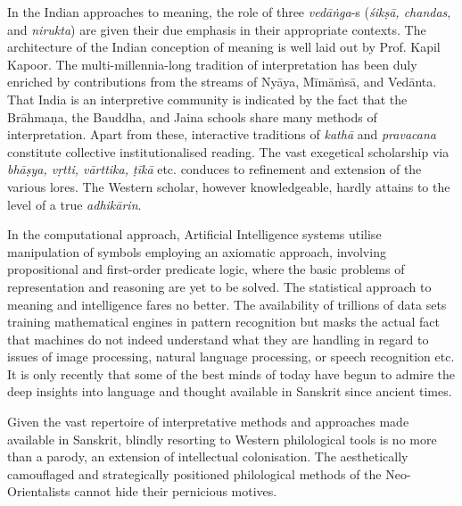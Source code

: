 In the Indian approaches to meaning, the role of three \textit{vedāṅga}-s (\textit{śikṣā, chandas}, and \textit{nirukta}) are given their due emphasis in their appropriate contexts. The architecture of the Indian conception of meaning is well laid out by Prof. Kapil Kapoor. The multi-millennia-long tradition of interpretation has been duly enriched by contributions from the streams of Nyāya, Mīmāṁsā, and Vedānta. That India is an interpretive community is indicated by the fact that the Brāhmaṇa, the Bauddha, and Jaina schools share many methods of interpretation. Apart from these, interactive traditions of \textit{kathā} and \textit{pravacana} constitute collective institutionalised reading. The vast exegetical scholarship via \textit{bhāṣya, vṛtti, vārttika, ṭīkā} etc. conduces to refinement and extension of the various lores. The Western scholar, however knowledgeable, hardly attains to the level of a true \textit{adhikārin}.

In the computational approach, Artificial Intelligence systems utilise manipulation of symbols employing an axiomatic approach, involving propositional and first-order predicate logic, where the basic problems of representation and reasoning are yet to be solved. The statistical approach to meaning and intelligence fares no better. The availability of trillions of data sets training mathematical engines in pattern recognition but masks the actual fact that machines do not indeed understand what they are handling in regard to issues of image processing, natural language processing, or speech recognition etc. It is only recently that some of the best minds of today have begun to admire the deep insights into language and thought available in Sanskrit since ancient times.

\vskip 2pt

Given the vast repertoire of interpretative methods and approaches made available in Sanskrit, blindly resorting to Western philological tools is no more than a parody, an extension of intellectual colonisation. The aesthetically camouflaged and strategically positioned philological methods of the Neo-Orientalists cannot hide their pernicious motives.

\vskip 2pt

